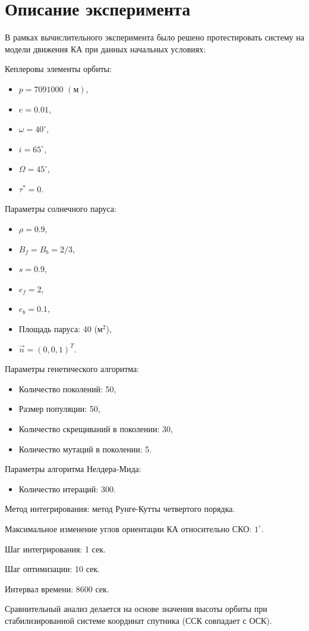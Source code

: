 \section{Описание эксперимента}
\noindent\indent В рамках вычислительного эксперимента было решено протестировать
систему на модели движения КА при данных начальных условиях:\par
\noindent Кеплеровы элементы орбиты:
\begin{itemize}
    \item $p = 7091000$ $(\text{м})$,
    \item $e = 0.01$,
    \item $\omega = 40^\circ$,
    \item $i = 65^\circ$,
    \item $\Omega = 45^\circ$,
    \item $\tau^* = 0$.
\end{itemize}
    Параметры солнечного паруса:
\begin{itemize}
    \item $\rho = 0.9$,
    \item $B_f = B_b = 2/3$,
    \item $s = 0.9$,
    \item $e_f = 2$,
    \item $e_b = 0.1$,
    \item Площадь паруса: 40 ($\text{м}^2$),
    \item $\vec{n} = (0, 0, 1)^T$.
\end{itemize}
Параметры генетического алгоритма:
\begin{itemize}
    \item Количество поколений: 50,
    \item Размер популяции: 50,
    \item Количество скрещиваний в поколении: 30,
    \item Количество мутаций в поколении: 5.
\end{itemize}
Параметры алгоритма Нелдера-Мида:
\begin{itemize}
    \item Количество итераций: $300$.
\end{itemize}\par
\noindent Метод интегрирования: метод Рунге-Кутты четвертого порядка.\par
\noindent Максимальное изменение углов ориентации КА относительно СКО: $1^\circ$.\par
\noindent Шаг интегрирования: 1 сек.\par
\noindent Шаг оптимизации: 10 сек.\par
\noindent Интервал времени: 8600 сек.\par
\noindent Сравнительный анализ делается на основе значения высоты орбиты при
стабилизированной системе координат спутника (ССК совпадает с ОСК).
